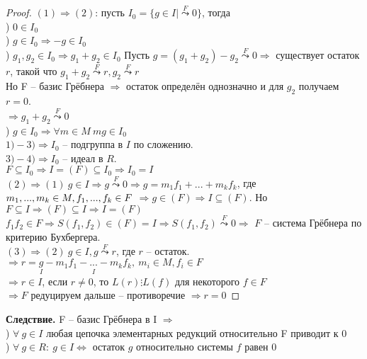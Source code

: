 \begin{proof} 
    $(1) \Rightarrow (2)$: пусть $I_0 = \{g \in I |  \overset{F}{\leadsto}0\}$, тогда \\
    ) $0 \in I_0$ \\
    ) $g \in I_0 \Rightarrow -g \in I_0$ \\
    ) $g_1, g_2 \in I_0 \Rightarrow g_1 + g_2 \in I_0$
    Пусть $g = (g_1 + g_2 ) - g_2\overset{F}{\leadsto}0\Rightarrow$ существует остаток $r$, такой что $g_1+g_2\overset{F}{\leadsto}r, g_2\overset{F}{\leadsto}r$\\
    Но F -- базис Грёбнера $\Rightarrow $ остаток определён однозначно и для $g_2$ получаем $r=0$.\\
    $\Rightarrow g_1+g_2\overset{F}{\leadsto}0$\\
    ) $g\in I_0\Rightarrow \forall m\in M\ mg\in I_0$\\
    \indent$1)-3)\Rightarrow I_0$ -- подгруппа в $I $ по сложению. \\
    \indent$3)-4)\Rightarrow I_0$ -- идеал в $R$.\\
    $F\subseteq I_0\Rightarrow I=(F)\subseteq I_0\Rightarrow I_0=I$\\
    \indent$(2)\Rightarrow (1) \ g\in I\Rightarrow g\overset{F}{\leadsto}0\Rightarrow g=m_1f_1+...+m_kf_k$, где $m_1,...,m_k\in M, f_1,...,f_k\in F\\$
    $\Rightarrow g\in (F)\Rightarrow I\subseteq (F)$. Но $F\subseteq I\Rightarrow (F)\subseteq I\Rightarrow I=(F)$\\
    $f_1f_2\in F\Rightarrow S(f_1,f_2)\in (F)=I\Rightarrow S(f_1,f_2)\overset{F}{\leadsto}0\Rightarrow$ $F$ -- система Грёбнера по критерию Бухбергера.\\
    \indent $(3)\Rightarrow (2) \ g\in I, g\overset{F}{\leadsto}r$, где $r$ -- остаток. $\Rightarrow r=\underset{I}{g}-\underset{I}{m_1f_1-...-m_kf_k}, \ m_i\in M, f_i\in F$\\
    $\Rightarrow r\in I$, если $r\neq 0$, то $L(r)\vdots L(f)$ для некоторого $f\in F$\\
    $\Rightarrow F$ редуцируем дальше -- противоречие $\Rightarrow r=0$
\end{proof}
\noindent \textbf{Следствие.} F -- базис Грёбнера в I $\Rightarrow $\\
) $\forall \ g\in I $ любая цепочка элементарных редукций относительно F приводит к 0\\
) $\forall \ g\in R:\ g\in I \Leftrightarrow $ остаток $g$ относительно системы $f$ равен 0
